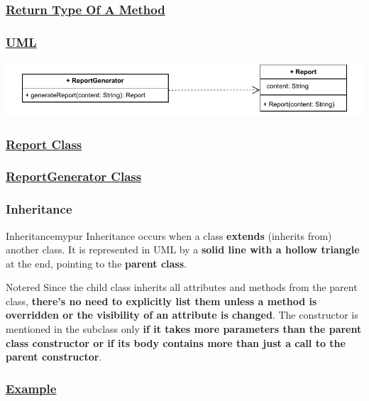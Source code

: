 \subsubsection*{\underline{Return Type Of A Method}}
\subsubsection*{\underline{UML}}
\includegraphics[width=\textwidth]{Chapters/Diagram/OOP/EX3/ex3.c.drawio.pdf}

\subsubsection*{\underline{Report Class}}


\subsubsection*{\underline{ReportGenerator Class}}


\subsubsection*{Inheritance}

\begin{prettyBox}{Inheritance}{mypur}
Inheritance occurs when a class \textbf{extends} (inherits from) another class. It is represented in UML by a \textbf{solid line with a hollow triangle} at the end, pointing to the \textbf{parent class}.
\end{prettyBox}

\begin{prettyBox}{Note}{red}
Since the child class inherits all attributes and methods from the parent
class, \textbf{there's no need to explicitly list them unless a method is overridden
or the visibility of an attribute is changed}. The constructor is mentioned in
the subclass only\textbf{ if it takes more parameters than the parent class constructor or if its body contains more than just a call to the parent constructor}.
\end{prettyBox}

\subsubsection*{\underline{Example}}

